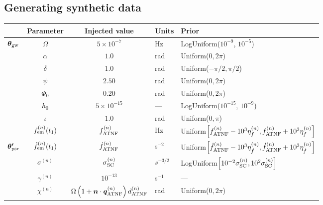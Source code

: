 \documentclass[fleqn,usenatbib,useAMS]{mnras}
\begin{document}
\subsection{Generating synthetic data}\label{sec:synthetic_data}
\begin{table}
	\centering
		\begin{tabular}{lccll}
			\toprule
			&Parameter & Injected value & Units & Prior  \\
			\hline
			\multirow{7}{2mm}{$\boldsymbol{\theta}_{\rm gw}$} & $\Omega$       & $5 \times 10^{-7}$ & Hz & LogUniform($10^{-9}$, $10^{-5}$) \\
			& $\alpha$          & $1.0$  & rad & Uniform($0, 2 \pi $)\\
			& $\delta$              & $1.0$  & rad & Uniform($-\pi/2, \pi/2$) \\
			& $\psi$              & $2.50$ & rad & Uniform($0, 2 \pi $) \\
			& $\Phi_0$          & $0.20$ & rad & Uniform($0, 2 \pi $) \\
			& $h_0$            & $5 \times 10^{-15}$ & --- & LogUniform($10^{-15}$, $10^{-9}$) \\
			& $\iota$             & $1.0$ & rad & Uniform($0, \pi$) \\ 
			\hline
			\vspace{1mm}& $f_{\rm em}^{(n)} (t_1)$       & $f_{\rm ATNF}^{(n)}$ & Hz & Uniform$\left[f_{\rm ATNF}^{(n)} - 10^3 \eta^{(n)}_{f}, f_{\rm ATNF}^{(n)} + 10^3 \eta^{(n)}_{f} \right]$ \\
      \multirow{2}{2mm}{$\boldsymbol{\theta'}_{\rm psr}$} & $\dot{f}_{\rm em}^{(n)} (t_1)$       & $\dot{f}_{\rm ATNF}^{(n)}$ & s$^{-2}$ & Uniform$\left[ \dot{f}_{\rm ATNF}^{(n)} - 10^3 \eta^{(n)}_{\dot{f}}, \dot{f}_{\rm ATNF}^{(n)} + 10^3 \eta^{(n)}_{\dot{f}} \right]$ \\
		     & $\sigma^{(n)}$              & $\sigma_{\rm SC}^{(n)}$ & $s^{-3/2}$ & LogUniform$ \left [10^{-2} \sigma_{\rm SC}^{(n)}, 10^2 \sigma_{\rm SC}^{(n)} \right ]$ \\
			& $\gamma^{(n)}$              & $10^{-13}$ & s$^{-1}$ & --- \\
			\hline
			\vspace{1mm} &  $\chi^{(n)}$       &$\Omega \left( 1 + \boldsymbol{n}\cdot \boldsymbol{q}^{(n)}_{\rm ATNF} \right)  d_{\rm ATNF}^{(n)} $  & rad & Uniform($0, 2 \pi $) \\
			\bottomrule
		\end{tabular}

\end{table}
\end{document}
